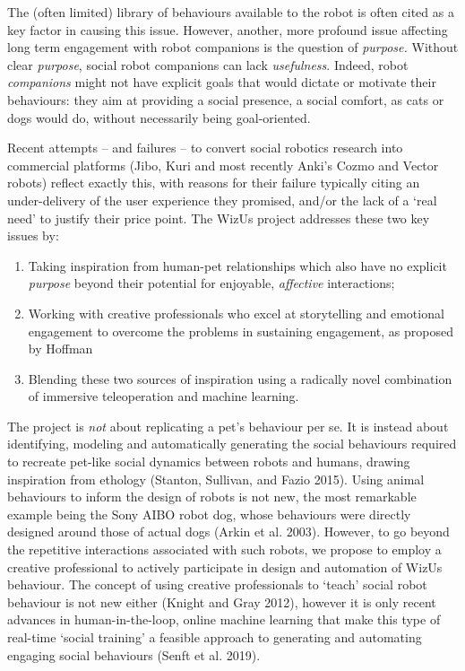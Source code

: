 \documentclass[11pt,a4paper]{report}
\newcommand{\project}{WizUs\xspace}
\begin{document}
The (often limited) library of behaviours available to the robot is
often cited as a key factor in causing this issue. However, another,
more profound issue affecting long term engagement with robot companions
is the question of \emph{purpose.} Without clear \emph{purpose}, social
robot companions can lack \emph{usefulness}. Indeed, robot
\emph{companions} might not have explicit goals that would dictate or
motivate their behaviours: they aim at providing a social presence, a
social comfort, as cats or dogs would do, without necessarily being
goal-oriented.

Recent attempts -- and failures -- to convert social robotics research
into commercial platforms (Jibo, Kuri and most recently Anki's Cozmo and
Vector robots) reflect exactly this, with reasons for their failure
typically citing an under-delivery of the user experience they promised,
and/or the lack of a `real need' to justify their price point. The
\project project addresses these two key issues by:

\begin{enumerate}
\def\labelenumi{\arabic{enumi}.}
\item
  Taking inspiration from human-pet relationships which also have no
  explicit \emph{purpose} beyond their potential for enjoyable,
  \emph{affective} interactions;
\item
  Working with creative professionals who excel at storytelling and
  emotional engagement to overcome the problems in sustaining
        engagement, as proposed by Hoffman~\cite{hoffman2019anki}
\item
  Blending these two sources of inspiration using a radically novel
  combination of immersive teleoperation and machine learning.
\end{enumerate}

The project is \emph{not} about replicating a pet's behaviour per se. It
is instead about identifying, modeling and automatically generating the
social behaviours required to recreate pet-like social dynamics between
robots and humans, drawing inspiration from ethology (Stanton, Sullivan,
and Fazio 2015). Using animal behaviours to inform the design of robots
is not new, the most remarkable example being the Sony AIBO robot dog,
whose behaviours were directly designed around those of actual dogs
(Arkin et al. 2003). However, to go beyond the repetitive interactions
associated with such robots, we propose to employ a creative
professional to actively participate in design and automation of \project
behaviour. The concept of using creative professionals to `teach' social
robot behaviour is not new either (Knight and Gray 2012), however it is
only recent advances in human-in-the-loop, online machine learning that
make this type of real-time `social training' a feasible approach to
generating and automating engaging social behaviours (Senft et al.
2019).
\end{document}
